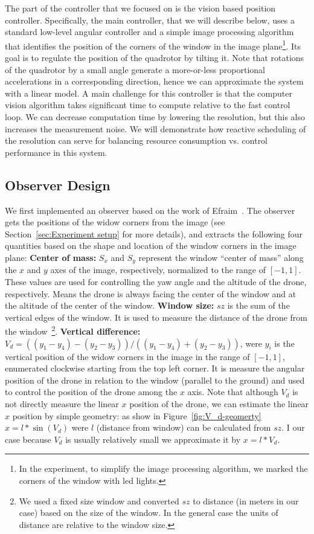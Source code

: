 \documentclass[ twoside, 12pt ]{article}
\begin{document}
The part of the controller that we focused on is the vision based position controller. Specifically, the main controller, that we will describe below, uses a standard low-level angular controller and a simple image processing algorithm that identifies the position of the corners of the window in the image plane\footnote{In the experiment, to simplify the image processing algorithm, we marked the corners of the window with led lights.}. Its goal is to regulate the position of the quadrotor by tilting it. Note that rotations of the quadrotor by a small angle generate a more-or-less proportional accelerations in a corresponding direction, hence we can approximate the system with a linear model. A main challenge for this controller is that the computer vision algorithm takes significant time to compute relative to the fast control loop. We can decrease computation time by lowering the resolution, but this also increases the measurement noise. We will demonstrate how reactive scheduling of the resolution can serve for balancing resource consumption vs. control performance in this system.

\subsection{Observer Design}
\label{sec:Observer Design}
We first implemented an observer based on the work of Efraim~\cite{Efraim17}. The observer gets the positions of the widow corners from the image (see Section~\ref{sec:Experiment setup} for more details), %
and extracts the following four quantities based on the shape and location of the window corners in the image plane: %
\textbf{Center of mass:} $S_x$ and $S_y$ represent the window ``center of mass'' along the $x$ and $y$ axes of the image, respectively, normalized to the range of $[-1,1]$.
These values are used for controlling the yaw angle and the altitude of the drone, respectively. Means the drone is always facing the center of the window and at the altitude of the center of the window. 
\textbf{Window size:} $sz$ is the sum of the vertical edges of the window. It is used to measure the distance of the drone from the window~\footnote{We used a fixed size window and converted $sz$ to distance (in meters in our case) based on the size of the window. In the general case the units of distance are relative to the window size.}.
\textbf{Vertical difference:} $V_d = {((y_1-y_4)-(y_2-y_3))}/{((y_1-y_4)+(y_2-y_3))}$, were $y_i$ is the vertical position of the widow corners in the image in the range of $[-1,1]$, enumerated clockwise starting from the top left corner. It is measure the angular position of the drone in relation to the window (parallel to the ground) and used to control the position of the drone among the $x$ axis.
Note that although $V_d$ is not directly measure the linear $x$ position of the drone, we can estimate the linear $x$ position by simple geometry:
as show in Figure~\ref{fig:V_d-geomerty} $x = l * \sin (V_d)$ were $l$ (distance from window) can be calculated from $sz$. I our case because $V_d$ is usually relatively small we approximate it by $x = l * V_d$.
\end{document}

